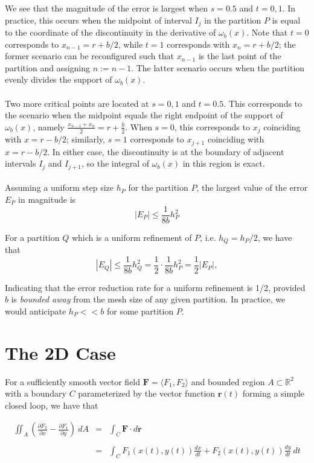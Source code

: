 \documentclass{article}
\begin{document}
\noindent
We see that the magnitude of the error is largest when $s = 0.5$ and $t = 0,1$. In practice, this occurs when the midpoint of interval $I_j$ in the partition $P$ is equal to the coordinate of the discontinuity in the derivative of $\omega_b(x)$. Note that $t = 0$ corresponds to $x_{n-1} = r + b/2$, while $t = 1$ corresponds with $x_n = r + b/2$; the former scenario can be reconfigured such that $x_{n-1}$ is the last point of the partition and assigning $n := n - 1$. The latter scenario occurs when the partition evenly divides the support of $\omega_b(x)$.
\\
\\
Two more critical points are located at $s = 0,1$ and $t = 0.5$. This corresponds to the scenario when the midpoint equals the right endpoint of the support of $\omega_b(x)$, namely $\frac{x_{n-1} + x_n}{2} = r + \frac{b}{2}$. When $s = 0$, this corresponds to $x_j$ coinciding with $x = r - b/2$; similarly, $s = 1$ corresponds to $x_{j+1}$ coinciding with $x = r - b/2$. In either case, the discontinuity is at the boundary of adjacent intervals $I_j$ and $I_{j+1}$, so the integral of $\omega_b(x)$ in this region is exact.
\\
\\
Assuming a uniform step size $h_P$ for the partition $P$, the largest value of the error $E_P$ in magnitude is
\[
    |E_P| \leq \frac{1}{8b}h_P^2
\]

\noindent
For a partition $Q$ which is a uniform refinement of $P$, i.e.
$h_Q = h_P / 2$, we have that
\[
    |E_Q| \leq \frac{1}{8b}h_Q^2 = \frac{1}{2} \cdot \frac{1}{8b} h_P^2 = \frac{1}{2}|E_P|,
\]

\noindent
Indicating that the error reduction rate for a uniform refinement is 1/2, provided $b$ is \textit{bounded away} from the mesh size of any given partition. In practice, we would anticipate $h_P << b$ for some partition $P$.

\newpage

\section{The 2D Case}

For a sufficiently smooth vector field $\mathbf{F} = \langle F_1, F_2 \rangle$ and bounded region $A \subset \mathbb{R}^2$ with a boundary $C$ parameterized by the vector function $\mathbf{r}(t)$ forming a simple closed loop, we have that

\[
    \begin{array}{rcl}
    \displaystyle
    \iint_A
    \left(
        \frac{\partial F_2}{\partial x}
        -
        \frac{\partial F_1}{\partial y}
    \right) \: dA
    &=&
    \displaystyle 
    \int_C \mathbf{F} \cdot d\mathbf{r} \\
    & & \\
    &=&
    \displaystyle
    \int_C
    F_1(x(t), y(t)) \frac{dx}{dt}
    +
    F_2(x(t), y(t)) \frac{dy}{dt} \: dt
    \end{array}
\]
\end{document}
